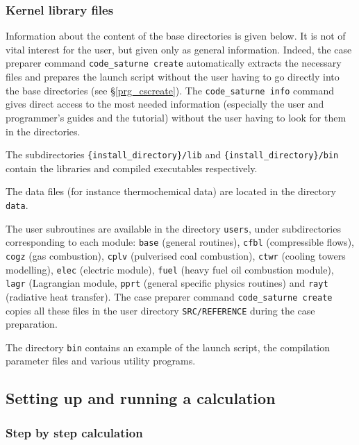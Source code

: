 {{{\subsubsection{\CS Kernel library files}
\label{prg_library}%
Information about the content of the \CS base directories is given below. It
is not of vital interest for the user, but given only as general
information. Indeed, the case preparer command \texttt{code\_saturne~create}
automatically extracts the necessary files and prepares the launch script
without the user having to go directly into the \CS base directories
(see \S\ref{prg_cscreate}).
The \texttt{code\_saturne~info} command gives direct
access to the most needed information (especially the user and programmer's
guides and the tutorial) without the user having to look for them in the \CS
directories.

The subdirectories \texttt{\{install\_directory\}/lib} and \texttt{\{install\_directory\}/bin }
contain the libraries and compiled executables respectively.

The data files (for instance thermochemical data) are located in the
directory \texttt{data}.

The user subroutines are available in the directory \texttt{users},
under subdirectories corresponding to each module:
\texttt{base} (general routines),
\texttt{cfbl} (compressible flows),
\texttt{cogz} (gas combustion),
\texttt{cplv} (pulverised coal combustion),
\texttt{ctwr} (cooling towers modelling),
\texttt{elec} (electric module),
\texttt{fuel} (heavy fuel oil combustion module),
\texttt{lagr} (Lagrangian module,
\texttt{pprt} (general specific physics routines) and
\texttt{rayt} (radiative heat transfer).
The case preparer command \texttt{code\_saturne~create} copies all these files
in the user directory \texttt{SRC/REFERENCE} during the case preparation.

The directory \texttt{bin} contains an example of the launch script, the
compilation parameter files and various utility programs.

\subsection{Setting up and running a calculation}

\subsubsection{Step by step calculation}
\label{prg_stepbystepcalculation}%

}}}

